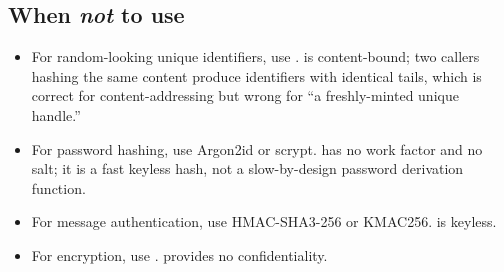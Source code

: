 \subsection{When \emph{not} to use \tesserahash{}}

\begin{itemize}
\item For random-looking unique identifiers, use \tesseraid{}. \tesserahash{} is content-bound; two callers hashing the same content produce identifiers with identical tails, which is correct for content-addressing but wrong for ``a freshly-minted unique handle.''
\item For password hashing, use Argon2id \citep{rfc9106} or scrypt. \tesserahash{} has no work factor and no salt; it is a fast keyless hash, not a slow-by-design password derivation function.
\item For message authentication, use HMAC-SHA3-256 or KMAC256. \tesserahash{} is keyless.
\item For encryption, use \tesseraseal{}. \tesserahash{} provides no confidentiality.
\end{itemize}
